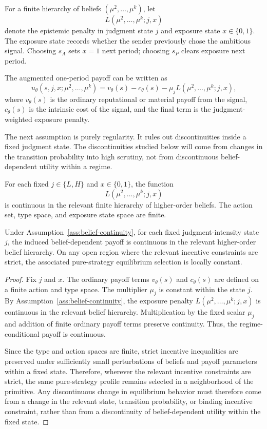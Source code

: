 For a finite hierarchy of beliefs $(\mu^2,\ldots,\mu^k)$, let
\[
L(\mu^2,\ldots,\mu^k;j,x)
\]
denote the epistemic penalty in judgment state $j$ and exposure state $x\in\{0,1\}$. The exposure state records whether the sender previously chose the ambitious signal. Choosing $s_A$ sets $x=1$ next period; choosing $s_P$ clears exposure next period.

The augmented one-period payoff can be written as
\[
u_\theta(s,j,x;\mu^2,\ldots,\mu^k)
=
v_\theta(s)-c_\theta(s)-\mu_j L(\mu^2,\ldots,\mu^k;j,x),
\]
where $v_\theta(s)$ is the ordinary reputational or material payoff from the signal, $c_\theta(s)$ is the intrinsic cost of the signal, and the final term is the judgment-weighted exposure penalty.

The next assumption is purely regularity. It rules out discontinuities inside a fixed judgment state. The discontinuities studied below will come from changes in the transition probability into high scrutiny, not from discontinuous belief-dependent utility within a regime.

\begin{assumption}
\label{ass:belief-continuity}
For each fixed $j\in\{L,H\}$ and $x\in\{0,1\}$, the function
\[
L(\mu^2,\ldots,\mu^k;j,x)
\]
is continuous in the relevant finite hierarchy of higher-order beliefs. The action set, type space, and exposure state space are finite.
\end{assumption}

\begin{lemma}
\label{lem:belief-utility-continuity}
Under Assumption~\ref{ass:belief-continuity}, for each fixed judgment-intensity state $j$, the induced belief-dependent payoff is continuous in the relevant higher-order belief hierarchy. On any open region where the relevant incentive constraints are strict, the associated pure-strategy equilibrium selection is locally constant.
\end{lemma}

\begin{proof}
Fix $j$ and $x$. The ordinary payoff terms $v_\theta(s)$ and $c_\theta(s)$ are defined on a finite action and type space. The multiplier $\mu_j$ is constant within the state $j$. By Assumption~\ref{ass:belief-continuity}, the exposure penalty $L(\mu^2,\ldots,\mu^k;j,x)$ is continuous in the relevant belief hierarchy. Multiplication by the fixed scalar $\mu_j$ and addition of finite ordinary payoff terms preserve continuity. Thus, the regime-conditional payoff is continuous.

Since the type and action spaces are finite, strict incentive inequalities are preserved under sufficiently small perturbations of beliefs and payoff parameters within a fixed state. Therefore, wherever the relevant incentive constraints are strict, the same pure-strategy profile remains selected in a neighborhood of the primitive. Any discontinuous change in equilibrium behavior must therefore come from a change in the relevant state, transition probability, or binding incentive constraint, rather than from a discontinuity of belief-dependent utility within the fixed state.
\end{proof}

